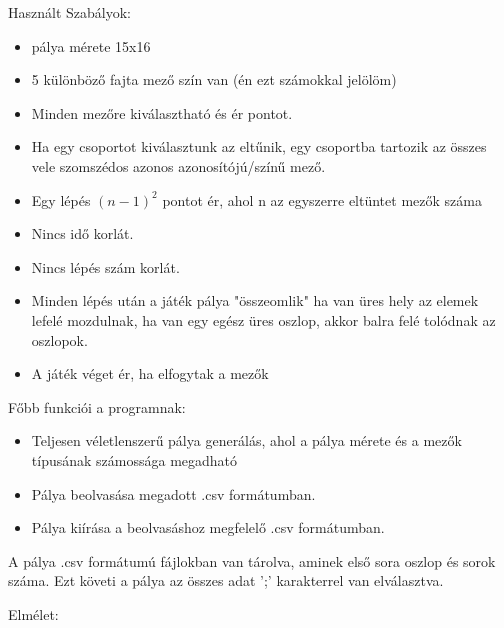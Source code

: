 \documentclass{article}
\begin{document}
	Használt Szabályok:
	\begin{itemize}		
		\item pálya mérete 15x16
		\item 5 különböző fajta mező szín van (én ezt számokkal jelölöm)
		\item  Minden mezőre kiválasztható és ér pontot. %
		\item Ha egy csoportot kiválasztunk az eltűnik, egy csoportba tartozik az összes vele szomszédos azonos azonosítójú/színű mező.
		\item Egy lépés \( (n-1)^2 \) pontot ér, ahol n az egyszerre eltüntet mezők száma
		\item Nincs idő korlát.
		\item Nincs lépés szám korlát.
		\item Minden lépés után a játék pálya "összeomlik" ha van üres hely az elemek lefelé mozdulnak, ha van egy egész üres oszlop, akkor balra felé tolódnak az oszlopok.
		\item A játék véget ér, ha elfogytak a mezők %
		
	\end{itemize}
	
	Főbb funkciói a programnak:
	\begin{itemize}
		\item Teljesen véletlenszerű pálya generálás, ahol a pálya mérete és a mezők típusának számossága megadható
		\item Pálya beolvasása megadott .csv formátumban.
		\item Pálya kiírása a beolvasáshoz megfelelő .csv formátumban.		
	\end{itemize}
	
	A pálya .csv formátumú fájlokban van tárolva, aminek első sora oszlop és sorok száma. Ezt követi a pálya az összes adat ';' karakterrel van elválasztva.
	
	
	Elmélet:
	
	
	
	
\end{document}
